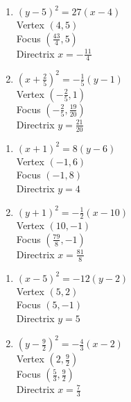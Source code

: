 \documentclass{ximera}
\begin{document}
\begin{multicols}{2}
\begin{enumerate}
\setcounter{enumi}{\value{HW}}


\item $(y - 5)^{2} = 27(x - 4)$\\
Vertex $(4, 5)$\\
Focus $\left( \frac{43}{4}, 5 \right)$\\
Directrix $x = -\frac{11}{4}$

\item $\left(x + \frac{2}{5} \right)^{2} = -\frac{1}{5}(y - 1)$\\
Vertex $\left( -\frac{2}{5}, 1 \right)$\\
Focus $\left( -\frac{2}{5}, \frac{19}{20} \right)$\\
Directrix $y = \frac{21}{20}$

\setcounter{HW}{\value{enumi}}
\end{enumerate}
\end{multicols}

\begin{multicols}{2}
\begin{enumerate}
\setcounter{enumi}{\value{HW}}


\item  $(x+1)^2=8(y-6)$ \\
Vertex $(-1,6)$\\
Focus $(-1,8)$ \\
Directrix $y=4$

\item  $(y+1)^2=-\frac{1}{2}(x-10)$\\
Vertex $(10,-1)$\\
Focus $\left(\frac{79}{8}, -1 \right)$\\
Directrix $x = \frac{81}{8}$

\setcounter{HW}{\value{enumi}}
\end{enumerate}
\end{multicols}

\begin{multicols}{2}
\begin{enumerate}
\setcounter{enumi}{\value{HW}}

\item $(x-5)^2 = -12(y-2)$\\
Vertex $(5,2)$\\
Focus $(5,-1)$ \\
Directrix $y=5$


\item  $\left(y-\frac{9}{2}\right)^2 = -\frac{4}{3} (x-2)$\\
Vertex $\left(2, \frac{9}{2}\right)$\\
Focus $\left(\frac{5}{3}, \frac{9}{2}\right)$\\
Directrix $x = \frac{7}{3}$

\setcounter{HW}{\value{enumi}}
\end{enumerate}
\end{multicols}
\end{document}
